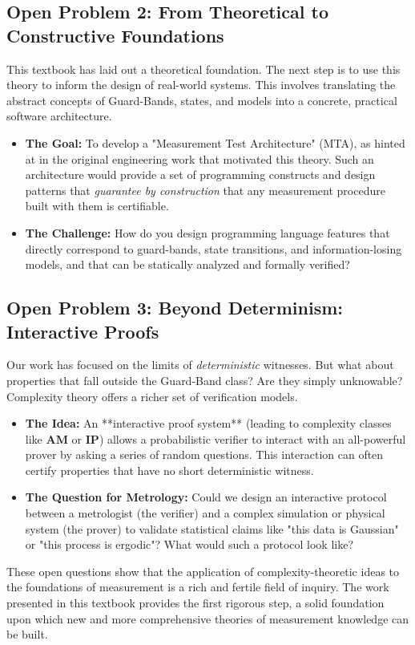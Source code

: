 \documentclass[12pt]{article}
\begin{document}
\subsection{Open Problem 2: From Theoretical to Constructive Foundations}
This textbook has laid out a theoretical foundation. The next step is to use this theory to inform the design of real-world systems. This involves translating the abstract concepts of Guard-Bands, states, and models into a concrete, practical software architecture.

\begin{itemize}
    \item \textbf{The Goal:} To develop a "Measurement Test Architecture" (MTA), as hinted at in the original engineering work that motivated this theory. Such an architecture would provide a set of programming constructs and design patterns that \emph{guarantee by construction} that any measurement procedure built with them is certifiable.
    \item \textbf{The Challenge:} How do you design programming language features that directly correspond to guard-bands, state transitions, and information-losing models, and that can be statically analyzed and formally verified?
\end{itemize}

\subsection{Open Problem 3: Beyond Determinism: Interactive Proofs}
Our work has focused on the limits of \emph{deterministic} witnesses. But what about properties that fall outside the Guard-Band class? Are they simply unknowable? Complexity theory offers a richer set of verification models.

\begin{itemize}
    \item \textbf{The Idea:} An **interactive proof system** (leading to complexity classes like $\mathbf{AM}$ or $\mathbf{IP}$) allows a probabilistic verifier to interact with an all-powerful prover by asking a series of random questions. This interaction can often certify properties that have no short deterministic witness.
    \item \textbf{The Question for Metrology:} Could we design an interactive protocol between a metrologist (the verifier) and a complex simulation or physical system (the prover) to validate statistical claims like "this data is Gaussian" or "this process is ergodic"? What would such a protocol look like?
\end{itemize}

These open questions show that the application of complexity-theoretic ideas to the foundations of measurement is a rich and fertile field of inquiry. The work presented in this textbook provides the first rigorous step, a solid foundation upon which new and more comprehensive theories of measurement knowledge can be built.
\end{document}
